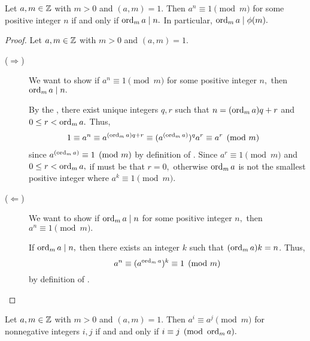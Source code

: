 \documentclass{ximera}
\begin{document}
\begin{proposition}\label{prop:order_divides_phi}
    Let $a,m\in\mathbb Z$ with $m>0$ and $(a,m)=1.$ Then $a^n\equiv 1\pmod{m}$ for some positive integer $n$ if and only if $\operatorname{ord}_m a\mid n.$ In particular, $\operatorname{ord}_m a\mid \phi(m).$

    \begin{proof}
        Let $a,m\in\mathbb Z$ with $m>0$ and $(a,m)=1.$

        \begin{description}
            \item[($\Rightarrow$)] We want to show if $a^n\equiv 1\pmod{m}$ for some positive integer $n,$ then $\operatorname{ord}_m a\mid n.$ 
            
            By the , there exist unique integers $q, r$ such that $n=(\operatorname{ord}_m a)q+r$ and $0\leq r< \operatorname{ord}_m a.$ Thus, 
                \begin{align*}
                    1 & \equiv a^n \equiv a^{(\operatorname{ord}_m a)q+r}\equiv (a^{(\operatorname{ord}_m a)})^q a^r \equiv a^r\pmod{m}
                \end{align*}
            since $a^{(\operatorname{ord}_m a)}\equiv 1\pmod{m}$ by definition of . Since $a^r\equiv 1\pmod{m}$ and $0\leq r< \operatorname{ord}_m a,$ if must be that $r=0,$ otherwise $\operatorname{ord}_m a$ is not the smallest positive integer where $a^k\equiv 1\pmod{m}.$

            \item[($\Leftarrow$)] We want to show if $\operatorname{ord}_m a\mid n$ for some positive integer $n,$ then $a^n\equiv 1\pmod{m}.$
            
            If $\operatorname{ord}_m a\mid n,$ then there exists an integer $k$ such that $(\operatorname{ord}_m a)k=n$. Thus, \[a^n\equiv (a^{\operatorname{ord}_m a})^k\equiv 1\pmod{m}\] by definition of .\qedhere
        \end{description}
    \end{proof}
\end{proposition}

\begin{proposition}\label{prop:exponents_mod_order}
    Let $a,m\in\mathbb Z$ with $m>0$ and $(a,m)=1.$ Then $a^i\equiv a^j\pmod{m}$ for nonnegative integers $i, j$ if and and only if $i\equiv j\pmod{\operatorname{ord}_m a}.$
\end{proposition}
\end{document}
